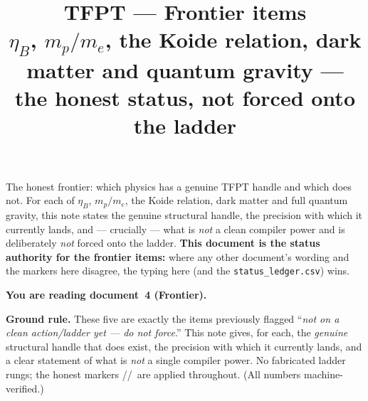 \documentclass[11pt,a4paper]{article}
\title{\vspace{-1.2cm}\textbf{TFPT --- Frontier items}\\[2mm]
\large $\eta_B$, $m_p/m_e$, the Koide relation, dark matter and quantum gravity ---\\
the honest status, not forced onto the ladder}
\author{\TFPTauthors}\date{\TFPTdatestamp}
\begin{document}
\maketitle
\vspace{-0.6cm}

\begin{keybox}
The honest frontier: which physics has a genuine TFPT handle and which does not. For each of
$\eta_B$, $m_p/m_e$, the Koide relation, dark matter and full quantum gravity, this note states the
genuine structural handle, the precision with which it currently lands, and --- crucially --- what is
\emph{not} a clean compiler power and is deliberately \emph{not} forced onto the ladder. \textbf{This
document is the status authority for the frontier items:} where any other document's wording and the
markers here disagree, the typing here (and the \texttt{status\_ledger.csv}) wins.
\end{keybox}


\noindent\textbf{You are reading \textbf{document~4} (Frontier).}


\TFPTbadges
\TFPTclaimstack[frontier]


\tableofcontents
\bigskip

\par\smallskip\noindent\textbf{Ground rule.} These five are exactly the items previously flagged
``\emph{not on a clean action/ladder yet --- do not force}.'' This note gives, for each, the
\emph{genuine} structural handle that does exist, the precision with which it currently lands, and a
clear statement of what is \emph{not} a single compiler power. No fabricated ladder rungs; the honest
markers \mE/\mC/\mO\ are applied throughout. (All numbers machine-verified.)
\end{document}
